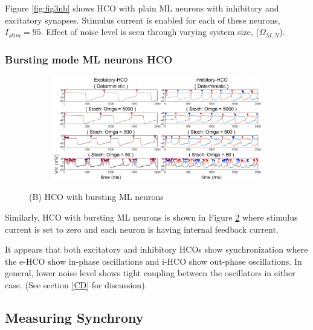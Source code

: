 \documentclass[
]{article}
\begin{document}
Figure \ref{fig:fig3nb} shows HCO with plain ML neurons with inhibitory and excitatory synapses. Stimulus current is enabled for each of these neurons, \(I_{stim}=95\). Effect of noise level is seen through varying system size, (\(\Omega_{M,N}\)).

\hypertarget{bursting-mode-ml-neurons-hco}{%
\subsubsection{Bursting mode ML neurons HCO}\label{bursting-mode-ml-neurons-hco}}

\begin{figure}    \ContinuedFloat
  \captionsetup[subfigure]{labelformat=empty} \centering
  \begin{subfigure}[b]{\textwidth}
      \caption{} \label{fig:fig3b}
      \includegraphics[width=\textwidth]{figs/F3_B_HCO_Omega_B.png}
  \end{subfigure}
  \vspace{-0.5cm}
  \caption{(B) HCO with bursting ML neurons}
\end{figure}

Similarly, HCO with bursting ML neurons is shown in Figure \ref{fig:fig3b} where stimulus current is set to zero and each neuron is having internal feedback current.

It appears that both excitatory and inhibitory HCOs show synchronization where the e-HCO show in-phase oscillations and i-HCO show out-phase oscillations. In general, lower noise level shows tight coupling between the oscillators in either case. (See section \ref{CD} for discussion).

\hypertarget{MLsync}{%
\subsection{Measuring Synchrony}\label{MLsync}}
\end{document}
